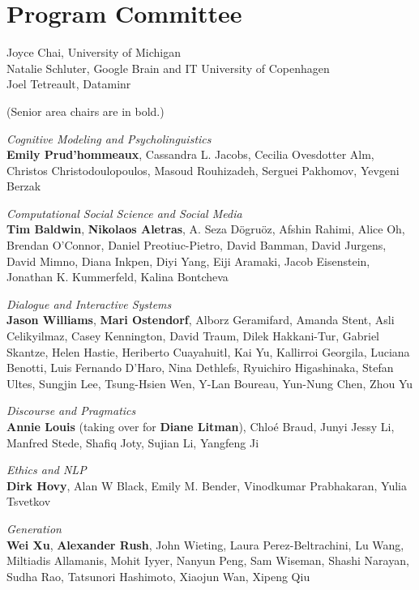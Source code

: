 
\clearpage
\section{Program Committee}
\setlength{\parindent}{0pt}

Joyce Chai, University of Michigan\\
Natalie Schluter, Google Brain and IT University of Copenhagen\\
Joel Tetreault, Dataminr

(Senior area chairs are in bold.)

\setlength{\leftskip}{0.5cm}
\renewcommand*{\aclitem}[1][]{\hspace{-0.5cm}\emph{#1}\\}

\aclitem[Cognitive Modeling and Psycholinguistics]
\textbf{Emily Prud'hommeaux},
Cassandra L. Jacobs, Cecilia Ovesdotter Alm, Christos Christodou\-lopoulos, Masoud Rouhizadeh, Serguei Pakhomov, Yevgeni Berzak

\aclitem[Computational Social Science and Social Media]
\textbf{Tim Baldwin},
\textbf{Nikolaos Aletras},
A. Seza D\"{o}gru\"{o}z, Afshin Rahimi, Alice Oh, Brendan O'Connor, Daniel Preotiuc-Pietro, David Bamman, David Jurgens, David Mimno, Diana Inkpen, Diyi Yang, Eiji Aramaki, Jacob Eisenstein, Jonathan K. Kummerfeld, Kalina Bontcheva

\aclitem[Dialogue and Interactive Systems]
\textbf{Jason Williams},
\textbf{Mari Ostendorf},
Alborz Geramifard, Amanda Stent, Asli Celikyilmaz, Casey Kennington, David Traum, Dilek Hakkani-Tur, Gabriel Skantze, Helen Hastie, Heriberto Cuayahuitl, Kai Yu, Kallirroi Georgila, Luciana Benotti, Luis Fernando D'Haro, Nina Dethlefs, Ryuichiro Higashinaka, Stefan Ultes, Sungjin Lee, Tsung-Hsien Wen, Y-Lan Boureau, Yun-Nung Chen, Zhou Yu

\aclitem[Discourse and Pragmatics]
\textbf{Annie Louis} (taking over for \textbf{Diane Litman}),
Chlo\'{e} Braud, Junyi Jessy Li, Manfred Stede, Shafiq Joty, Sujian Li, Yangfeng Ji

\aclitem[Ethics and NLP]
\textbf{Dirk Hovy},
Alan W Black, Emily M. Bender, Vinodkumar Prabhakaran, Yulia Tsvetkov

\aclitem[Generation]
\textbf{Wei Xu},
\textbf{Alexander Rush},
John Wieting, Laura Perez-Beltrachini, Lu Wang, Miltiadis Allamanis, Mohit Iyyer, Nanyun Peng, Sam Wiseman, Shashi Narayan, Sudha Rao, Tatsunori Hashimoto, Xiaojun Wan, Xipeng Qiu

